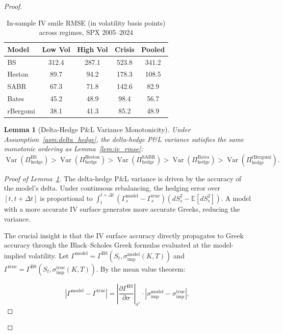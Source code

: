 \documentclass[11pt,a4paper]{article}
\theoremstyle{plain}
\newtheorem{lemma}[theorem]{Lemma}
\theoremstyle{definition}
\theoremstyle{remark}
\newcommand{\E}{\mathbb{E}}
\newcommand{\Var}{\operatorname{Var}}
\newcommand{\BS}{\text{BS}}
\newcommand{\Heston}{\text{Heston}}
\newcommand{\SABR}{\text{SABR}}
\newcommand{\BatesM}{\text{Bates}}
\newcommand{\rBergomi}{\text{rBergomi}}
\begin{document}
\begin{proof}
\begin{table}[H]
\centering
\caption{In-sample IV smile RMSE (in volatility basis points) across regimes, SPX 2005--2024}
\label{tab:rmse_empirical}
\begin{tabular}{l|ccc|c}
\toprule
Model    & Low Vol & High Vol & Crisis & Pooled \\
\midrule
BS       & 312.4 & 287.1 & 523.8 & 341.2 \\
Heston   & 89.7  & 94.2  & 178.3 & 108.5 \\
SABR     & 67.3  & 71.8  & 142.6 & 82.9  \\
Bates    & 45.2  & 48.9  & 98.4  & 56.7  \\
rBergomi & 38.1  & 41.3  & 85.2  & 48.9  \\
\bottomrule
\end{tabular}
\end{table}

\begin{lemma}[Delta-Hedge P\&L Variance Monotonicity]\label{lem:delta_hedge}
Under Assumption~\ref{asm:delta_hedge}, the delta-hedge P\&L variance satisfies the same monotonic ordering as Lemma~\ref{lem:iv_rmse}:
\begin{equation}\label{eq:lem2}
  \Var(\Pi_{\text{hedge}}^{\BS}) > \Var(\Pi_{\text{hedge}}^{\Heston}) > \Var(\Pi_{\text{hedge}}^{\SABR}) > \Var(\Pi_{\text{hedge}}^{\BatesM}) > \Var(\Pi_{\text{hedge}}^{\rBergomi}).
\end{equation}
\end{lemma}

\begin{proof}[Proof of Lemma~\ref{lem:delta_hedge}]
The delta-hedge P\&L variance is driven by the accuracy of the model's delta. Under continuous rebalancing, the hedging error over $[t, t+\Delta t]$ is proportional to $\int_t^{t+\Delta t} (\Gamma_s^{\text{model}} - \Gamma_s^{\text{true}}) (dS_s^2 - \E[dS_s^2])$. A model with a more accurate IV surface generates more accurate Greeks, reducing the variance.

The crucial insight is that the IV surface accuracy directly propagates to Greek accuracy through the Black--Scholes Greek formulas evaluated at the model-implied volatility. Let $\Gamma^{\text{model}} = \Gamma^{\text{BS}}(S_t, \sigma_{\text{imp}}^{\text{model}}(K,T))$ and $\Gamma^{\text{true}} = \Gamma^{\text{BS}}(S_t, \sigma_{\text{imp}}^{\text{true}}(K,T))$. By the mean value theorem:

\begin{equation}\label{eq:gamma_error}
  |\Gamma^{\text{model}} - \Gamma^{\text{true}}| = \left|\frac{\partial \Gamma^{\text{BS}}}{\partial \sigma}\right|_{\sigma^*} \cdot |\sigma_{\text{imp}}^{\text{model}} - \sigma_{\text{imp}}^{\text{true}}|,
\end{equation}


\end{proof}
\end{proof}
\end{document}
